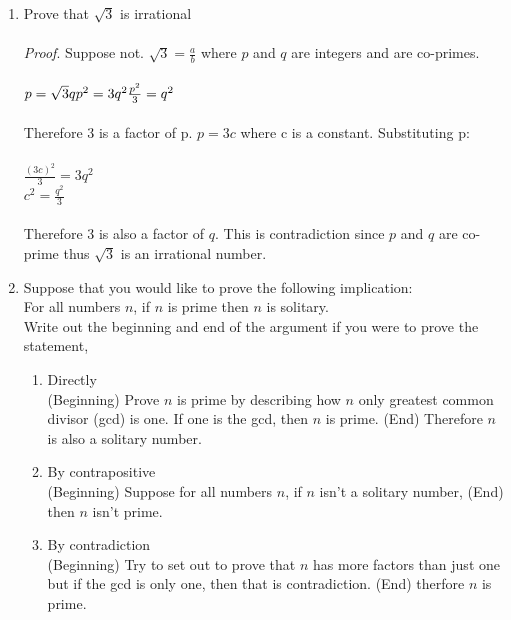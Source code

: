 \documentclass[11pt,a4paper]{article}
\newcommand\setItemNumber[1]{\setcounter{enumi}{\numexpr#1-1\relax}}
\begin{document}
\begin{enumerate}
        \setItemNumber{6}
        \item Prove that $\sqrt{3}$ is irrational\\\\
            \textit{Proof}. Suppose not. $\sqrt{3} = \frac{a}{b}$ where $p$ and $q$ are integers and are co-primes.\\\\$p = \sqrt{3}q\\ p^2 = 3q^2 \\ \frac{p^2}{3} = q^2$\\\\ Therefore  3 is a factor of p. $p = 3c$ where c is a constant. Substituting p:\\\\ $\frac{(3c)^2}{3} = 3q^2$\\$c^2 = \frac{q^2}{3}$\\\\ Therefore 3 is also a factor of $q$. This is contradiction since $p$ and $q$ are co-prime thus $\sqrt{3}$ is an irrational number.

        \setItemNumber{10}
        \item Suppose that you would like to prove the following implication:\\
            For all numbers $n$, if $n$ is prime then $n$ is solitary.\\
            Write out the beginning and end of the argument if you were to prove the statement,\\
            \begin{enumerate}
                \item Directly\\
                    (Beginning) Prove $n$ is prime by describing how $n$ only greatest common divisor (gcd) is one. If one is the gcd, then $n$ is prime. (End) Therefore $n$ is also a solitary number.
                \item By contrapositive\\
                    (Beginning) Suppose for all numbers $n$, if $n$ isn't a solitary number, (End) then $n$ isn't prime.
                \item By contradiction\\
                    (Beginning) Try to set out to prove that $n$ has more factors than just one but if the gcd is only one, then that is contradiction. (End) therfore $n$ is prime.
            \end{enumerate}

        \end{enumerate}
\end{document}
